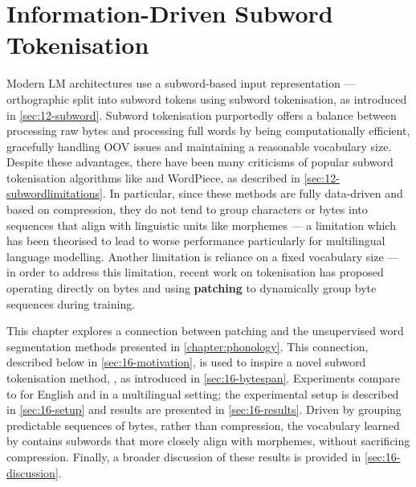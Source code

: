 \chapter{Information-Driven Subword Tokenisation}\label{chapter:infotokenisation}

Modern LM architectures use a subword-based input representation --- orthographic split into subword tokens using subword tokenisation, as introduced in \cref{sec:12-subword}. Subword tokenisation purportedly offers a balance between processing raw bytes and processing full words by being computationally efficient, gracefully handling OOV issues and maintaining a reasonable vocabulary size. Despite these advantages, there have been many criticisms of popular subword tokenisation algorithms like \bpe and WordPiece, as described in \cref{sec:12-subwordlimitations}. In particular, since these methods are fully data-driven and based on compression, they do not tend to group characters or bytes into sequences that align with linguistic units like morphemes --- a limitation which has been theorised to lead to worse performance particularly for multilingual language modelling. Another limitation is reliance on a fixed vocabulary size --- in order to address this limitation, recent work on tokenisation has proposed operating directly on bytes and using \textbf{patching} to dynamically group byte sequences during training.

This chapter explores a connection between patching and the unsupervised word segmentation methods presented in \cref{chapter:phonology}. This connection, described below in \cref{sec:16-motivation}, is used to inspire a novel subword tokenisation method, \tokname, as introduced in \cref{sec:16-bytespan}.  Experiments compare \tokname to \bpe for English and in a multilingual setting; the experimental setup is described in \cref{sec:16-setup} and results are presented in \cref{sec:16-results}. Driven by grouping predictable sequences of bytes, rather than compression, the vocabulary learned by \tokname contains subwords that more closely align with morphemes, without sacrificing compression. Finally, a broader discussion of these results is provided in \cref{sec:16-discussion}.


